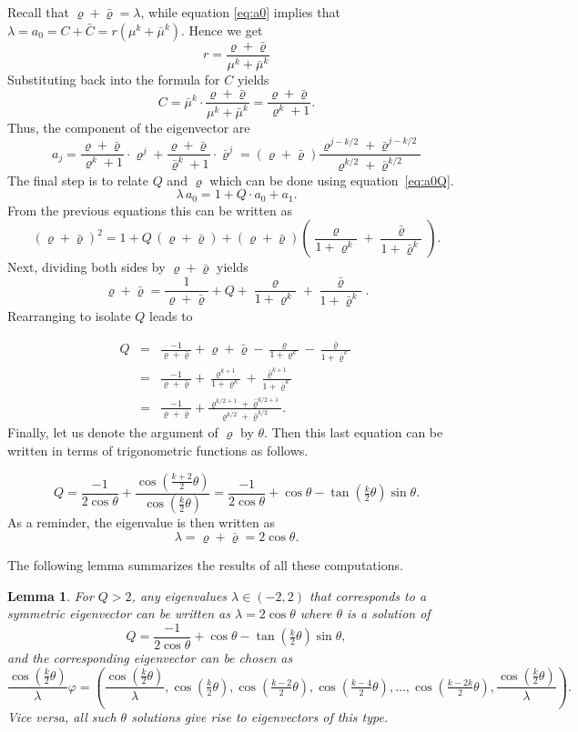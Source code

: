 \documentclass{article}
\newtheorem{lemma}[theorem]{Lemma}
\theoremstyle{definition}
\numberwithin{equation}{section}
\numberwithin{theorem}{section}
\newcommand{\ro}{\varrho}
\newcommand{\brho}{\bar{\varrho}}
\begin{document}
Recall that $\ro+\brho = \lambda$, while equation \eqref{eq:a0} implies that $\lambda = a_0 = C + \bar{C}= r(\mu^k+\bar{\mu}^k)$. Hence we get 
\[
r=\frac{\ro+\brho}{\mu^k+ \bar{\mu}^k}
\]
Substituting back into the formula for \(C\) yields
\[  
C = \bar{\mu}^k \cdot \frac{\ro+\brho}{\mu^k+ \bar{\mu}^k}
= \frac{\ro+\brho}{\ro^k+1}.
\]
 Thus, the component of the eigenvector are
\[
a_j = \frac{\ro+\brho}{\ro^k+1} \cdot \ro^j + \frac{\ro+\brho}{\brho^k+1} \cdot \brho^j = (\ro+\brho)\frac{\ro^{j-k/2} + \brho^{j-k/2}}{\ro^{k/2}+\brho^{k/2}}
\]
The final step is to relate $Q$ and $\ro$ which can be done using equation~\eqref{eq:a0Q}.
\[
\lambda\,a_0 = 1 + Q\cdot a_0 + a_1.
\]
From the previous equations this can be written as 
\[
(\ro+\brho)^2
= 1 + Q\,(\ro+\brho)
  + (\ro+\brho)\left(\frac{\ro}{1+\ro^k} + \frac{\brho}{1+\brho^k}\right).
\]
Next, dividing both sides by 
\(\ro+\brho\) yields
\[
\ro+\brho
= \frac{1}{\ro+\brho}
  + Q
  + \frac{\ro}{1+\ro^k}
  + \frac{\brho}{1+\brho^k}.
\]
Rearranging to isolate \(Q\) leads to

\begin{eqnarray} \label{eq:q+1/lambda}
    Q &=& \frac{-1}{\ro+\brho}+
 \ro+\brho
  - \frac{\ro}{1+\ro^k}
  - \frac{\brho}{1+\brho^k}\\&=&
     \frac{-1}{\ro+\brho}
+ \frac{\ro^{k+1}}{1+\ro^k} + \frac{\brho^{k+1}}{1+\brho^k} \\
 &=& 
\frac{-1}{\ro+\brho} + \frac{\ro^{k/2+1}+\brho^{k/2+1}}{\ro^{k/2} + \brho^{k/2}}.
\end{eqnarray}
Finally, let us denote the argument of $\ro$ by $\theta$. Then this last equation can be written in terms of trigonometric functions as follows.

\[
Q = \frac{-1}{2\cos\theta}
+ \frac{\cos(\tfrac{k+2}{2}\theta)}
       {\cos(\tfrac{k}{2} \theta)}= \frac{-1}{2\cos \theta}+\cos \theta - \tan \left(\tfrac{k}{2}\theta\right)\sin \theta .
\]
As a reminder, the eigenvalue is then written as 
\[
\lambda = \ro + \brho
        = 2\cos \theta.
\]

The following lemma summarizes the results of all these computations.

\begin{lemma}\label{lem:sym_case}
    For $Q > 2$, any eigenvalues $\lambda \in (-2,2)$ that corresponds to a symmetric eigenvector can be written as $\lambda = 2\cos \theta$ where $\theta$ is a solution of 
\[    Q =  \frac{-1}{2\cos \theta}+\cos \theta - \tan \left(\tfrac{k}{2}\theta\right)\sin \theta, \] 
and the corresponding eigenvector can be chosen as 
\[ \frac{\cos(\tfrac{k}{2}\theta)}{\lambda}\varphi = \left(\frac{\cos(\tfrac{k}{2}\theta)}{\lambda}, \cos(\tfrac{k}{2}\theta),\cos(\tfrac{k-2}{2}\theta),\cos(\tfrac{k-4}{2}\theta),\dots, \cos(\tfrac{k-2k}{2}\theta),\frac{\cos(\tfrac{k}{2}\theta)}{\lambda}\right).\]
Vice versa, all such $\theta$ solutions give rise to eigenvectors of this type.
\end{lemma}
\end{document}
